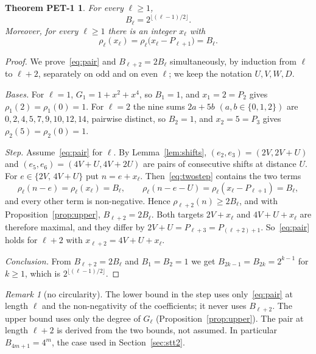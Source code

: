 \documentclass[11pt]{amsart}
\theoremstyle{definition}
\theoremstyle{remark}
\newtheorem{remark}[lemma]{Remark}
\theoremstyle{plain}
\newtheorem*{thmPETone}{Theorem PET-1}
\numberwithin{equation}{section}
\newcommand{\floor}[1]{\lfloor #1\rfloor}
\begin{document}
\begin{thmPETone}\label{thm:pet1}
For every $\ell\ge1$,
\[
B_\ell=2^{\floor{(\ell-1)/2}}.
\]
Moreover, for every $\ell\ge1$ there is an integer $x_\ell$ with
\begin{equation}\label{eq:pair}
\rho_\ell(x_\ell)=\rho_\ell\bigl(x_\ell-P_{\ell+1}\bigr)=B_\ell .
\end{equation}
\end{thmPETone}

\begin{proof}
We prove~\eqref{eq:pair} and $B_{\ell+2}=2B_\ell$ simultaneously, by induction from $\ell$ to
$\ell+2$, separately on odd and on even $\ell$; we keep the notation $U,V,W,D$.

\emph{Bases.} For $\ell=1$, $G_1=1+x^2+x^4$, so $B_1=1$, and $x_1=2=P_2$ gives
$\rho_1(2)=\rho_1(0)=1$. For $\ell=2$ the nine sums $2a+5b$ $(a,b\in\{0,1,2\})$ are
$0,2,4,5,7,9,10,12,14$, pairwise distinct, so $B_2=1$, and $x_2=5=P_3$ gives
$\rho_2(5)=\rho_2(0)=1$.

\emph{Step.} Assume~\eqref{eq:pair} for $\ell$. By Lemma~\ref{lem:shifts}, $(e_2,e_3)=(2V,2V+U)$ and
$(e_5,e_6)=(4V+U,4V+2U)$ are pairs of consecutive shifts at distance $U$. For
$e\in\{2V,\,4V+U\}$ put $n=e+x_\ell$. Then~\eqref{eq:twostep} contains the two terms
\[
\rho_\ell(n-e)=\rho_\ell(x_\ell)=B_\ell,\qquad
\rho_\ell(n-e-U)=\rho_\ell(x_\ell-P_{\ell+1})=B_\ell,
\]
and every other term is non-negative. Hence $\rho_{\ell+2}(n)\ge2B_\ell$, and with
Proposition~\ref{prop:upper}, $B_{\ell+2}=2B_\ell$. Both targets $2V+x_\ell$ and $4V+U+x_\ell$ are
therefore maximal, and they differ by $2V+U=P_{\ell+3}=P_{(\ell+2)+1}$. So~\eqref{eq:pair} holds for
$\ell+2$ with $x_{\ell+2}=4V+U+x_\ell$.

\emph{Conclusion.} From $B_{\ell+2}=2B_\ell$ and $B_1=B_2=1$ we get $B_{2k-1}=B_{2k}=2^{k-1}$ for
$k\ge1$, which is $2^{\floor{(\ell-1)/2}}$.
\end{proof}

\begin{remark}[no circularity]\label{rem:noncirc}
The lower bound in the step uses only~\eqref{eq:pair} at length $\ell$ and the non-negativity of the
coefficients; it never uses $B_{\ell+2}$. The upper bound uses only the degree of $G_\ell$
(Proposition~\ref{prop:upper}). The pair at length $\ell+2$ is derived from the two bounds, not
assumed. In particular $B_{4m+1}=4^m$, the case used in Section~\ref{sec:stt2}.
\end{remark}
\end{document}
